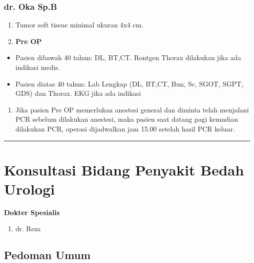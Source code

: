 \documentclass[
]{book}
\providecommand{\tightlist}{%
  \setlength{\itemsep}{0pt}\setlength{\parskip}{0pt}}
\begin{document}
\hypertarget{dr.-oka-sp.b}{%
\subsubsection{dr. Oka Sp.B}\label{dr.-oka-sp.b}}

\begin{enumerate}
\def\labelenumi{\arabic{enumi}.}
\tightlist
\item
  Tumor soft tissue minimal ukuran 4x4 cm.
\item
  \textbf{Pre OP}
\end{enumerate}

\begin{itemize}
\tightlist
\item
  Pasien dibawah 40 tahun: DL, BT,CT. Rontgen Thorax dilakukan jika ada indikasi medis.
\item
  Pasien diatas 40 tahun: Lab Lengkap (DL, BT,CT, Bun, Sc, SGOT, SGPT, GDS) dan Thorax. EKG jika ada indikasi
\end{itemize}

\begin{enumerate}
\def\labelenumi{\arabic{enumi}.}
\setcounter{enumi}{2}
\tightlist
\item
  Jika pasien Pre OP memerlukan anestesi general dan diminta telah menjalani PCR sebelum dilakukan anestesi, maka pasien saat datang pagi kemudian dilakukan PCR, operasi dijadwalkan jam 15.00 setelah hasil PCR keluar.
\end{enumerate}

\begin{center}\rule{0.5\linewidth}{0.5pt}\end{center}

\hypertarget{konsultasi-bidang-penyakit-bedah-urologi}{%
\section{Konsultasi Bidang Penyakit Bedah Urologi}\label{konsultasi-bidang-penyakit-bedah-urologi}}

\textbf{Dokter Spesialis}

\begin{enumerate}
\def\labelenumi{\arabic{enumi}.}
\tightlist
\item
  dr. Reza
\end{enumerate}

\hypertarget{pedoman-umum-4}{%
\subsection{Pedoman Umum}\label{pedoman-umum-4}}
\end{document}
